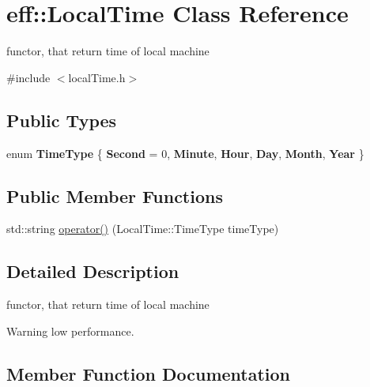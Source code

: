 \hypertarget{classeff_1_1LocalTime}{}\section{eff\+:\+:Local\+Time Class Reference}
\label{classeff_1_1LocalTime}


functor, that return time of local machine  




{\ttfamily \#include $<$local\+Time.\+h$>$}

\subsection*{Public Types}
\begin{DoxyCompactItemize}
\item 
\mbox{\label{classeff_1_1LocalTime_a09de312805bf8c27785ca4fab8c94767}} 
enum {\bfseries Time\+Type} \{ \newline
{\bfseries Second} = 0, 
{\bfseries Minute}, 
{\bfseries Hour}, 
{\bfseries Day}, 
\newline
{\bfseries Month}, 
{\bfseries Year}
 \}
\end{DoxyCompactItemize}
\subsection*{Public Member Functions}
\begin{DoxyCompactItemize}
\item 
std\+::string \mbox{\hyperlink{classeff_1_1LocalTime_a602662475583a2d6490a13edb2e5e1cc}{operator()}} (Local\+Time\+::\+Time\+Type time\+Type)
\end{DoxyCompactItemize}


\subsection{Detailed Description}
functor, that return time of local machine 

\begin{DoxyWarning}{Warning}
low performance. 
\end{DoxyWarning}


\subsection{Member Function Documentation}
\mbox{\label{classeff_1_1LocalTime_a602662475583a2d6490a13edb2e5e1cc}} 
